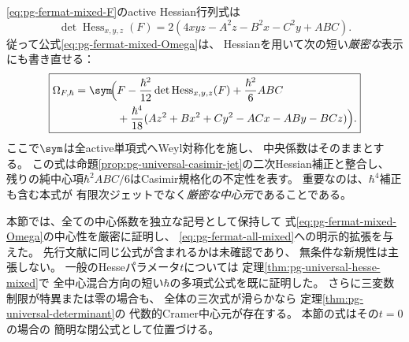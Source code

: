 \begin{remark}[Hessianジェットとの一致と新規性]
\label{rem:pg-fermat-mixed-hessian}
\eqref{eq:pg-fermat-mixed-F}のactive Hessian行列式は
\begin{equation}
 \det\operatorname{Hess}_{x,y,z}(F)
 =2(4xyz-A^2z-B^2x-C^2y+ABC).
\end{equation}
従って公式\eqref{eq:pg-fermat-mixed-Omega}は、
Hessianを用いて次の短い\emph{厳密な}表示にも書き直せる：
\begin{equation}
\boxed{\begin{aligned}
\Omega_{F,\hbar}
 =\sym\!\Bigl(&F-\frac{\hbar^2}{12}\det\operatorname{Hess}_{x,y,z}(F)
 +\frac{\hbar^2}{6}ABC\\
 &+\frac{\hbar^4}{18}
 (Az^2+Bx^2+Cy^2-ACx-ABy-BCz)\Bigr).
\end{aligned}}
\label{eq:pg-fermat-mixed-hessian}
\end{equation}
ここで$\sym$は全active単項式へWeyl対称化を施し、
中央係数はそのままとする。
この式は命題\ref{prop:pg-universal-casimir-jet}の二次Hessian補正と整合し、
残りの純中心項$\hbar^2ABC/6$はCasimir規格化の不定性を表す。
重要なのは、$\hbar^4$補正も含む本式が
有限次ジェットでなく\emph{厳密な中心元}であることである。

本節では、全ての中心係数を独立な記号として保持して
式\eqref{eq:pg-fermat-mixed-Omega}の中心性を厳密に証明し、
\eqref{eq:pg-fermat-all-mixed}への明示的拡張を与えた。
先行文献に同じ公式が含まれるかは未確認であり、
無条件な新規性は主張しない。
一般のHesseパラメータ$t$については
定理\ref{thm:pg-universal-hesse-mixed}で
全中心混合方向の短い$\hbar$の多項式公式を既に証明した。
さらに三変数制限が特異または零の場合も、
全体の三次式が滑らかなら
定理\ref{thm:pg-universal-determinant}の
代数的Cramer中心元が存在する。
本節の式はその$t=0$の場合の
簡明な閉公式として位置づける。
\end{remark}
